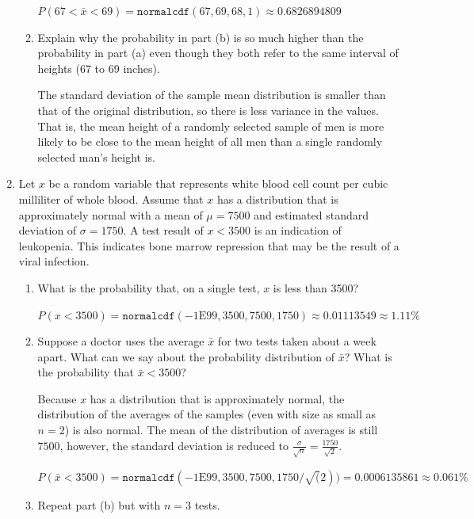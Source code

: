 \documentclass[11pt]{article}
\newcommand{\answer}[1]{\color{white}#1}
\begin{document}
\begin{enumerate}
\begin{enumerate}
{	$P(67 < \bar{x} < 69) = \texttt{normalcdf}(67, 69, 68, 1) \approx 0.6826894809$
	} 

	\item Explain why the probability in part (b) is so much higher than the probability in part (a) even though they both refer to the same interval of heights (67 to 69 inches). 
	
	{\answer The standard deviation of the sample mean distribution is smaller than that of the original distribution, so there is less variance in the values.  That is, the mean height of a randomly selected sample of men is more likely to be close to the mean height of all men than a single randomly selected man's height is.
	} 
	\end{enumerate}

	
\item Let $x$ be a random variable that represents white blood cell count per cubic milliliter of whole blood.  Assume that $x$ has a distribution that is approximately normal with a mean of $\mu = 7500$ and estimated standard deviation of $\sigma = 1750$.  A test result of $x<3500$ is an indication of leukopenia.  This indicates bone marrow repression that may be the result of a viral infection.

	\begin{enumerate}
	
	\item What is the probability that, on a single test, $x$ is less than 3500? 
	
	{\answer $P(x<3500) = \texttt{normalcdf}(-1\mbox{E}99, 3500, 7500, 1750) \approx 0.01113549 \approx 1.11\%$
	} 

	\item Suppose a doctor uses the average $\bar x$ for two tests taken about a week apart.  What can we say about the probability distribution of $\bar x$?  What is the probability that $\bar x < 3500$? 
	
	{\answer Because $x$ has a distribution that is approximately normal, the distribution of the averages of the samples (even with size as small as $n=2$) is also normal.  The mean of the distribution of averages is still $7500$, however, the standard deviation is reduced to $\frac{\sigma}{\sqrt{n}} = \frac{1750}{\sqrt{2}}.$ 
	
	$P(\bar{x} < 3500) = \texttt{normalcdf}(-1\mbox{E}99, 3500, 7500, 1750/\sqrt(2)) = 0.0006135861 \approx 0.061\%$
	} 

	\item Repeat part (b) but with $n=3$ tests. 
	

\end{enumerate}
\end{enumerate}
\end{document}
